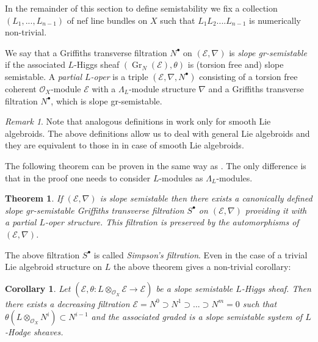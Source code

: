\documentclass[12pt]{article}
\theoremstyle{plain}
\newtheorem{Theorem}[Thm]{\sc Theorem}
\newtheorem{Corollary}[Thm]{\sc Corollary}
\theoremstyle{definition}
\theoremstyle{remark}
\newtheorem{Remark}[Thm]{Remark}
\newcommand{\cE}{{\mathcal E}}
\newcommand{\cO}{{\mathcal O}}
\newcommand{\Gr}{{\mathop{Gr}}}
\begin{document}
\medskip

In the remainder of this section to define semistability we fix a collection
 $(L_1,...,L_{n-1})$ of nef line bundles on $X$ such that $L_1L_2....L_{n-1}$ is numerically non-trivial.


We say that a Griffiths transverse
filtration $N^{\bullet}$ on $(\cE, \nabla)$ is \emph{slope
gr-semistable} if the associated $L$-Higgs sheaf
$(\Gr_N(\cE), \theta)$ is (torsion free and) slope semi\-sta\-ble. A \emph{partial
$L$-oper} is a triple $(\cE, \nabla, N^{\bullet})$ consisting of a
torsion free coherent $\cO _X$-module $\cE$ with a
${\Lambda_L}$-module structure $\nabla$ and a Griffiths transverse
filtration $N^{\bullet}$, which is slope gr-semistable.

\medskip

\begin{Remark}
Note that analogous definitions in \cite[Section 5.2]{La2} work only for smooth Lie algebroids. 
The above definitions allow us to deal with general Lie algebroids and  they are equivalent to those in 
 \cite[Section 5.2]{La2} in case of smooth Lie algebroids. 
\end{Remark}

\medskip


The following theorem can be proven in the same way as \cite[Theorem 5.5]{La4}.
The only difference is that in the proof one needs to consider $L$-modules as 
$\Lambda_L$-modules.

\begin{Theorem} \label{existence-of-gr-ss-Griffiths-transverse-filtration}
If $(\cE, \nabla)$ is slope semistable then there exists a
canonically defined slope gr-semistable Griffiths transverse
filtration $S^{\bullet}$ on $(\cE, \nabla)$ providing it with a
partial $L$-oper structure. This filtration is preserved by the
automorphisms of $(\cE,\nabla)$.
\end{Theorem}

The above filtration $S^{\bullet}$ is called \emph{Simpson's filtration}.
Even in the case of a trivial Lie algebroid structure on $L$ the above theorem gives 
a non-trivial corollary:

\begin{Corollary}\label{deformation-to-system}
  Let $(\cE, \theta : L \otimes _{\cO_X} \cE\to \cE)$ be a slope
  semistable  $L$-Higgs sheaf. Then there exists a decreasing
  filtration $\cE=N^0\supset N^1\supset ...\supset N^m=0$ such that
  $\theta (L \otimes _{\cO_X}N^i)\subset N^{i-1}$ and the associated
  graded is a slope semistable system of $L$-Hodge sheaves.
  \end{Corollary}
\end{document}
